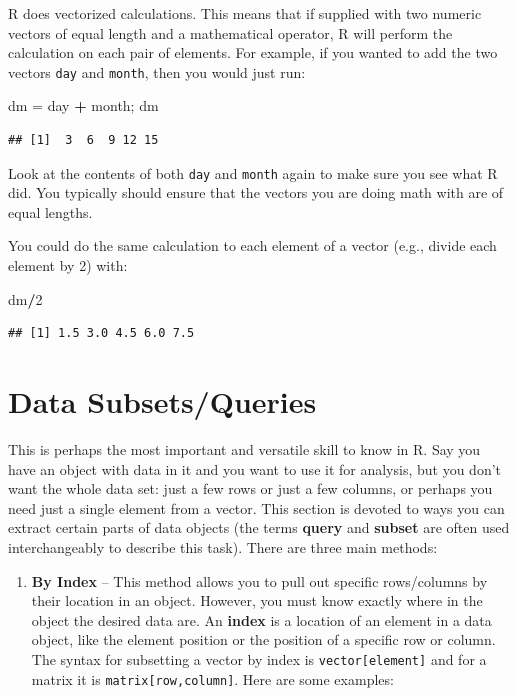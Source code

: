 \documentclass[]{book}
\newenvironment{Shaded}{\begin{snugshade}}{\end{snugshade}}
\newcommand{\DecValTok}[1]{\textcolor[rgb]{0.00,0.00,0.81}{#1}}
\newcommand{\NormalTok}[1]{#1}
\newcommand{\OperatorTok}[1]{\textcolor[rgb]{0.81,0.36,0.00}{\textbf{#1}}}
\newcommand{\StringTok}[1]{\textcolor[rgb]{0.31,0.60,0.02}{#1}}
\providecommand{\tightlist}{%
  \setlength{\itemsep}{0pt}\setlength{\parskip}{0pt}}
\begin{document}
R does vectorized calculations. This means that if supplied with two numeric vectors of equal length and a mathematical operator, R will perform the calculation on each pair of elements. For example, if you wanted to add the two vectors \texttt{day} and \texttt{month}, then you would just run:

\begin{Shaded}
\begin{Highlighting}[]
\NormalTok{dm =}\StringTok{ }\NormalTok{day }\OperatorTok{+}\StringTok{ }\NormalTok{month; dm}
\end{Highlighting}
\end{Shaded}

\begin{verbatim}
## [1]  3  6  9 12 15
\end{verbatim}

Look at the contents of both \texttt{day} and \texttt{month} again to make sure you see what R did. You typically should ensure that the vectors you are doing math with are of equal lengths.

You could do the same calculation to each element of a vector (e.g., divide each element by 2) with:

\begin{Shaded}
\begin{Highlighting}[]
\NormalTok{dm}\OperatorTok{/}\DecValTok{2}
\end{Highlighting}
\end{Shaded}

\begin{verbatim}
## [1] 1.5 3.0 4.5 6.0 7.5
\end{verbatim}

\hypertarget{sub}{%
\section{Data Subsets/Queries}\label{sub}}

This is perhaps the most important and versatile skill to know in R. Say you have an object with data in it and you want to use it for analysis, but you don't want the whole data set: just a few rows or just a few columns, or perhaps you need just a single element from a vector. This section is devoted to ways you can extract certain parts of data objects (the terms \textbf{query} and \textbf{subset} are often used interchangeably to describe this task). There are three main methods:

\begin{enumerate}
\def\labelenumi{\arabic{enumi}.}
\tightlist
\item
  \textbf{By Index} -- This method allows you to pull out specific rows/columns by their location in an object. However, you must know exactly where in the object the desired data are. An \textbf{index} is a location of an element in a data object, like the element position or the position of a specific row or column. The syntax for subsetting a vector by index is \texttt{vector{[}element{]}} and for a matrix it is \texttt{matrix{[}row,column{]}}. Here are some examples:
\end{enumerate}
\end{document}
